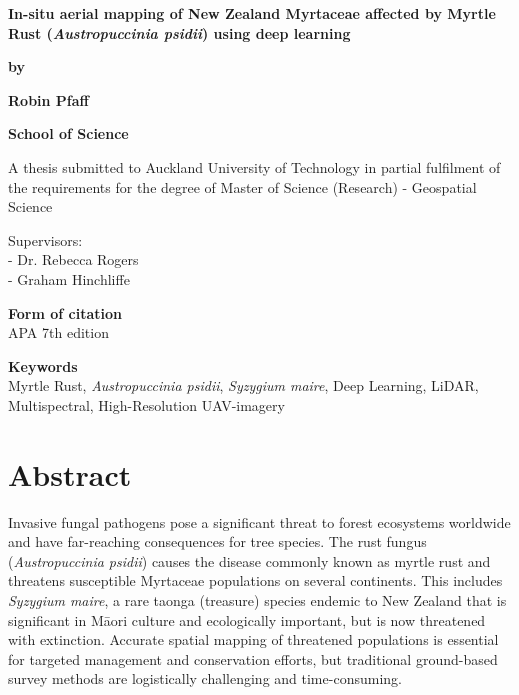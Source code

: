 \documentclass[
]{scrreprt}
\author{Robin Pfaff}
\date{2025-12}
\begin{document}
\begin{titlepage}
    \centering
    \vspace*{2cm}
    {\fontsize{18}{22}\bfseries In-situ aerial mapping of New Zealand Myrtaceae affected by Myrtle Rust (\textit{Austropuccinia psidii}) using deep learning\par}
    \vspace{5.5cm}
    {\fontsize{12}{14}\bfseries by\par}
    {\fontsize{12}{14}\bfseries Robin Pfaff\par}
    {\fontsize{12}{14}\par}
    \vspace{5cm}
    {\fontsize{12}{14}\bfseries School of Science\par}
    \vspace{1.5cm}
    {\fontsize{12}{14}\selectfont A thesis submitted to Auckland University of Technology in partial fulfilment
of the requirements for the degree of Master of Science (Research) - Geospatial Science\par}
    \vfill
    \begin{flushleft}
        Supervisors:\\
        - Dr. Rebecca Rogers\\
        - Graham Hinchliffe
    \end{flushleft}
\end{titlepage}

\clearpage
{}
\setcounter{page}{2}

\thispagestyle{empty}
\vspace*{\fill}


\vspace{0.5cm}

\noindent\textbf{Form of citation}\\
APA 7th edition

\noindent\textbf{Keywords}\\
Myrtle Rust, \textit{Austropuccinia psidii}, \textit{Syzygium maire}, Deep Learning, LiDAR, Multispectral, High-Resolution UAV-imagery
\newpage


\chapter*{Abstract}\label{abstract}

Invasive fungal pathogens pose a significant threat to forest ecosystems
worldwide and have far-reaching consequences for tree species. The rust
fungus (\emph{Austropuccinia psidii}) causes the disease commonly known
as myrtle rust and threatens susceptible Myrtaceae populations on
several continents. This includes \emph{Syzygium maire}, a rare taonga
(treasure) species endemic to New Zealand that is significant in Māori
culture and ecologically important, but is now threatened with
extinction. Accurate spatial mapping of threatened populations is
essential for targeted management and conservation efforts, but
traditional ground-based survey methods are logistically challenging and
time-consuming.
\end{document}
